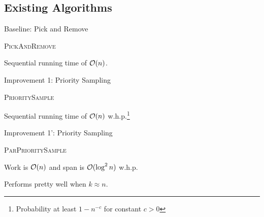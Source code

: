 \subsection{Existing Algorithms}

\begin{frame}{Baseline: Pick and Remove}
  \begin{algorithm}[H]
    \caption{\textsc{PickAndRemove}}
  \begin{algorithmic}
    \EndFor
  \end{algorithmic}
  \end{algorithm}

  Sequential running time of \(\mathcal{O}(n)\).
\end{frame}

\begin{frame}{Improvement 1: Priority Sampling}
  \begin{algorithm}[H]
    \caption{\textsc{PrioritySample}}
  \begin{algorithmic}

  \end{algorithmic}
  \end{algorithm}

  Sequential running time of \(\mathcal{O}(n)\) w.h.p.\footnote{Probability at least \(1 -
  n^{-c}\) for constant \(c > 0\)}
\end{frame}

\begin{frame}{Improvement 1': Priority Sampling}
  \begin{algorithm}[H]
    \caption{\textsc{ParPrioritySample}}
  \begin{algorithmic}

  \end{algorithmic}
  \end{algorithm}

  Work is \(\mathcal{O}(n)\) and span is \(\mathcal{O}(\log^2 n)\) w.h.p.

  Performs pretty well when \(k \approx n\).
\end{frame}

